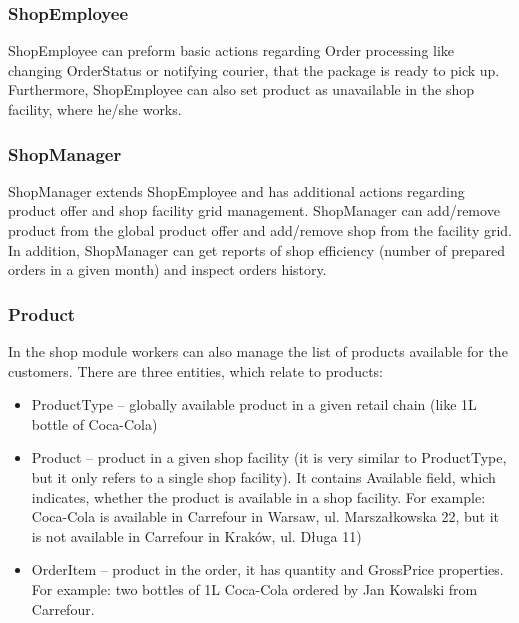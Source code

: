 \documentclass[../../main.tex]{subfiles}
\begin{document}
\subsubsection{ShopEmployee}

ShopEmployee can preform basic actions regarding Order processing like changing OrderStatus or notifying courier, that the package is ready to pick up. Furthermore, ShopEmployee can also set product as unavailable in the shop facility, where he/she works.  
 
\subsubsection{ShopManager}

ShopManager extends ShopEmployee and has additional actions regarding product offer and shop facility grid management. ShopManager can add/remove product from the global product offer and add/remove shop from the facility grid. In addition, ShopManager can get reports of shop efficiency (number of prepared orders in a given month) and inspect orders history.

\subsubsection{Product}

In the shop module workers can also manage the list of products available for the customers. There are three entities, which relate to products:
\begin{itemize}
  \item ProductType -- globally available product in a given retail chain (like 1L bottle of Coca-Cola)
  \item Product -- product in a given shop facility (it is very similar to ProductType, but it only refers to a single shop facility). It contains Available field, which indicates, whether the product is available in a shop facility. For example: Coca-Cola is available in Carrefour in Warsaw, ul. Marszałkowska 22, but it is not available in Carrefour in Kraków, ul. Długa 11)
  \item OrderItem -- product in the order, it has quantity and GrossPrice properties. For example: two bottles of 1L Coca-Cola ordered by Jan Kowalski from Carrefour.
\end{itemize}
\end{document}
